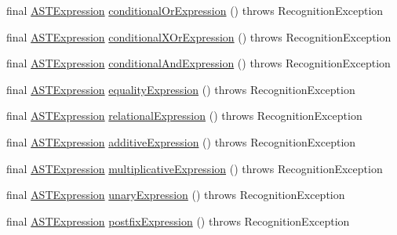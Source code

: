 \begin{DoxyCompactItemize}
final \hyperlink{classorg_1_1tzi_1_1use_1_1parser_1_1ocl_1_1_a_s_t_expression}{A\-S\-T\-Expression} \hyperlink{classorg_1_1tzi_1_1use_1_1parser_1_1testsuite_1_1_test_suite_parser_a7a194742b9c03ebd62589607c699ad1c}{conditional\-Or\-Expression} ()  throws Recognition\-Exception 
\item 
final \hyperlink{classorg_1_1tzi_1_1use_1_1parser_1_1ocl_1_1_a_s_t_expression}{A\-S\-T\-Expression} \hyperlink{classorg_1_1tzi_1_1use_1_1parser_1_1testsuite_1_1_test_suite_parser_adc45ad88488fac2f58ee008dcff22500}{conditional\-X\-Or\-Expression} ()  throws Recognition\-Exception 
\item 
final \hyperlink{classorg_1_1tzi_1_1use_1_1parser_1_1ocl_1_1_a_s_t_expression}{A\-S\-T\-Expression} \hyperlink{classorg_1_1tzi_1_1use_1_1parser_1_1testsuite_1_1_test_suite_parser_a5280968b73bc1ed3ccc6b2e2b3a85a81}{conditional\-And\-Expression} ()  throws Recognition\-Exception 
\item 
final \hyperlink{classorg_1_1tzi_1_1use_1_1parser_1_1ocl_1_1_a_s_t_expression}{A\-S\-T\-Expression} \hyperlink{classorg_1_1tzi_1_1use_1_1parser_1_1testsuite_1_1_test_suite_parser_adf814012489fc83e73c2724adb86a72f}{equality\-Expression} ()  throws Recognition\-Exception 
\item 
final \hyperlink{classorg_1_1tzi_1_1use_1_1parser_1_1ocl_1_1_a_s_t_expression}{A\-S\-T\-Expression} \hyperlink{classorg_1_1tzi_1_1use_1_1parser_1_1testsuite_1_1_test_suite_parser_adcee4e07228295265508a7a988e51dac}{relational\-Expression} ()  throws Recognition\-Exception 
\item 
final \hyperlink{classorg_1_1tzi_1_1use_1_1parser_1_1ocl_1_1_a_s_t_expression}{A\-S\-T\-Expression} \hyperlink{classorg_1_1tzi_1_1use_1_1parser_1_1testsuite_1_1_test_suite_parser_a2f860e7be75c26ce0edf2daf0ca48aeb}{additive\-Expression} ()  throws Recognition\-Exception 
\item 
final \hyperlink{classorg_1_1tzi_1_1use_1_1parser_1_1ocl_1_1_a_s_t_expression}{A\-S\-T\-Expression} \hyperlink{classorg_1_1tzi_1_1use_1_1parser_1_1testsuite_1_1_test_suite_parser_afde08a74b7918a5b5a7205fda1bc8a4d}{multiplicative\-Expression} ()  throws Recognition\-Exception 
\item 
final \hyperlink{classorg_1_1tzi_1_1use_1_1parser_1_1ocl_1_1_a_s_t_expression}{A\-S\-T\-Expression} \hyperlink{classorg_1_1tzi_1_1use_1_1parser_1_1testsuite_1_1_test_suite_parser_abac613d4f984b7ac81c2fff5982d5dd2}{unary\-Expression} ()  throws Recognition\-Exception 
\item 
final \hyperlink{classorg_1_1tzi_1_1use_1_1parser_1_1ocl_1_1_a_s_t_expression}{A\-S\-T\-Expression} \hyperlink{classorg_1_1tzi_1_1use_1_1parser_1_1testsuite_1_1_test_suite_parser_a8109d0869d4fb0de3ed8d80613221473}{postfix\-Expression} ()  throws Recognition\-Exception 

\end{DoxyCompactItemize}
